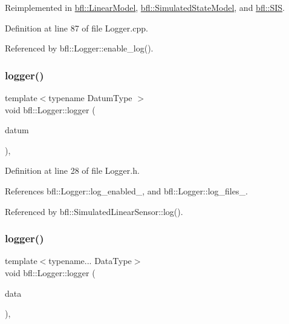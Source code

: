 Reimplemented in \mbox{\hyperlink{classbfl_1_1LinearModel_a8b8f645a7b7d8ebbb02c8958428fcf10}{bfl\+::\+Linear\+Model}}, \mbox{\hyperlink{classbfl_1_1SimulatedStateModel_ab4212871b8ca425855ec351c13dc3052}{bfl\+::\+Simulated\+State\+Model}}, and \mbox{\hyperlink{classbfl_1_1SIS_a805aef60946bfcaae4f65473dc7bd5ae}{bfl\+::\+S\+IS}}.



Definition at line 87 of file Logger.\+cpp.



Referenced by bfl\+::\+Logger\+::enable\+\_\+log().

\mbox{\label{classbfl_1_1Logger_a1033ff31398484f2132f84fd140da9e3}} 
\subsubsection{\texorpdfstring{logger()}{logger()}\hspace{0.1cm}{\footnotesize\ttfamily [1/4]}}
{\footnotesize\ttfamily template$<$typename Datum\+Type $>$ \\
void bfl\+::\+Logger\+::logger (\begin{DoxyParamCaption}\item[{Datum\+Type}]{datum }\end{DoxyParamCaption})\hspace{0.3cm}{\ttfamily [inline]}, {\ttfamily [inherited]}}



Definition at line 28 of file Logger.\+h.



References bfl\+::\+Logger\+::log\+\_\+enabled\+\_\+, and bfl\+::\+Logger\+::log\+\_\+files\+\_\+.



Referenced by bfl\+::\+Simulated\+Linear\+Sensor\+::log().

\mbox{\label{classbfl_1_1Logger_aca2086c9256e5c404872b91f7f25b97d}} 
\subsubsection{\texorpdfstring{logger()}{logger()}\hspace{0.1cm}{\footnotesize\ttfamily [2/4]}}
{\footnotesize\ttfamily template$<$typename... Data\+Type$>$ \\
void bfl\+::\+Logger\+::logger (\begin{DoxyParamCaption}\item[{Data\+Type...}]{data }\end{DoxyParamCaption})\hspace{0.3cm}{\ttfamily [inline]}, {\ttfamily [inherited]}}



